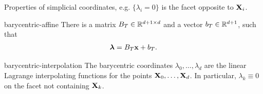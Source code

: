 \begin{todo}
  Properties of simplicial coordinates, e.g. $\{\lambda_i=0\}$ is the facet opposite to $\mathbf X_i$.
\end{todo}

\begin{Lemma}{barycentric-affine}
  There is a matrix $B_T\in \mathbb R^{d+1\times d}$ and a vector
  $b_T\in\mathbb R^{d+1}$, such that
  \begin{gather}
    \boldsymbol\lambda = B_T\mathbf x + b_T.
  \end{gather}
\end{Lemma}

\begin{Corollary}{barycentric-interpolation}
  The barycentric coordinates $\lambda_0,\dots,\lambda_d$ are the
  linear Lagrange interpolating functions for the points
  $\mathbf X_0,\dots,\mathbf X_d$. In particular, $\lambda_k \equiv 0$ on
  the facet not containing $\mathbf X_k$.
\end{Corollary}

